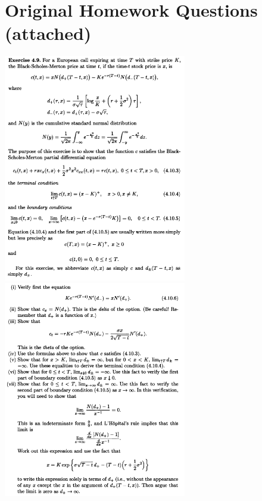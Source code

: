 \documentclass[final,3p,authoryear]{elsarticle}
\begin{document}
\section{Original Homework Questions (attached)}
%	
	\includegraphics[width=8cm]{Ex4p9a.png}
	\includegraphics[width=8cm]{Ex4p9b.png}


%
%
%
	
	
%
%
%
%
%
%
\end{document}

